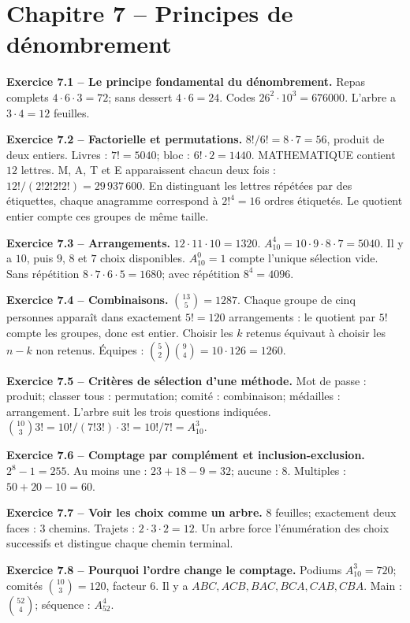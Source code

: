 \chapter*{Chapitre 7 -- Principes de dénombrement}
\begin{answerbox}
\textbf{Exercice 7.1 -- Le principe fondamental du dénombrement.} Repas complets $4\cdot6\cdot3=72$; sans dessert $4\cdot6=24$. Codes $26^2\cdot10^3=676000$. L'arbre a $3\cdot4=12$ feuilles.\par
\textbf{Exercice 7.2 -- Factorielle et permutations.} $8!/6!=8\cdot7=56$, produit de deux entiers. Livres : $7!=5040$; bloc : $6!\cdot2=1440$. MATHEMATIQUE contient $12$ lettres. M, A, T et E apparaissent chacun deux fois : $12!/(2!2!2!2!)=29\,937\,600$. En distinguant les lettres répétées par des étiquettes, chaque anagramme correspond à $2!^4=16$ ordres étiquetés. Le quotient entier compte ces groupes de même taille.\par
\textbf{Exercice 7.3 -- Arrangements.} $12\cdot11\cdot10=1320$. $A_{10}^4=10\cdot9\cdot8\cdot7=5040$. Il y a $10$, puis $9$, $8$ et $7$ choix disponibles. $A_{10}^0=1$ compte l'unique sélection vide. Sans répétition $8\cdot7\cdot6\cdot5=1680$; avec répétition $8^4=4096$.\par
\textbf{Exercice 7.4 -- Combinaisons.} $\binom{13}{5}=1287$. Chaque groupe de cinq personnes apparaît dans exactement $5!=120$ arrangements : le quotient par $5!$ compte les groupes, donc est entier. Choisir les $k$ retenus équivaut à choisir les $n-k$ non retenus. Équipes : $\binom52\binom94=10\cdot126=1260$.\par
\textbf{Exercice 7.5 -- Critères de sélection d'une méthode.} Mot de passe : produit; classer tous : permutation; comité : combinaison; médailles : arrangement. L'arbre suit les trois questions indiquées. $\binom{10}{3}3!=10!/(7!3!)\cdot3!=10!/7!=A_{10}^3$.\par
\textbf{Exercice 7.6 -- Comptage par complément et inclusion-exclusion.} $2^8-1=255$. Au moins une : $23+18-9=32$; aucune : $8$. Multiples : $50+20-10=60$.\par
\textbf{Exercice 7.7 -- Voir les choix comme un arbre.} $8$ feuilles; exactement deux faces : $3$ chemins. Trajets : $2\cdot3\cdot2=12$. Un arbre force l'énumération des choix successifs et distingue chaque chemin terminal.\par
\textbf{Exercice 7.8 -- Pourquoi l'ordre change le comptage.} Podiums $A_{10}^3=720$; comités $\binom{10}{3}=120$, facteur $6$. Il y a $ABC,ACB,BAC,BCA,CAB,CBA$. Main : $\binom{52}{4}$; séquence : $A_{52}^4$.\par

\end{answerbox}
